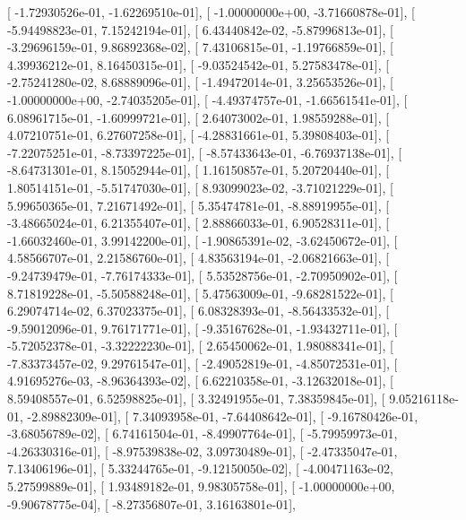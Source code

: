 \documentclass{article}
\begin{document}
       [ -1.72930526e-01,  -1.62269510e-01],
       [ -1.00000000e+00,  -3.71660878e-01],
       [ -5.94498823e-01,   7.15242194e-01],
       [  6.43440842e-02,  -5.87996813e-01],
       [ -3.29696159e-01,   9.86892368e-02],
       [  7.43106815e-01,  -1.19766859e-01],
       [  4.39936212e-01,   8.16450315e-01],
       [ -9.03524542e-01,   5.27583478e-01],
       [ -2.75241280e-02,   8.68889096e-01],
       [ -1.49472014e-01,   3.25653526e-01],
       [ -1.00000000e+00,  -2.74035205e-01],
       [ -4.49374757e-01,  -1.66561541e-01],
       [  6.08961715e-01,  -1.60999721e-01],
       [  2.64073002e-01,   1.98559288e-01],
       [  4.07210751e-01,   6.27607258e-01],
       [ -4.28831661e-01,   5.39808403e-01],
       [ -7.22075251e-01,  -8.73397225e-01],
       [ -8.57433643e-01,  -6.76937138e-01],
       [ -8.64731301e-01,   8.15052944e-01],
       [  1.16150857e-01,   5.20720440e-01],
       [  1.80514151e-01,  -5.51747030e-01],
       [  8.93099023e-02,  -3.71021229e-01],
       [  5.99650365e-01,   7.21671492e-01],
       [  5.35474781e-01,  -8.88919955e-01],
       [ -3.48665024e-01,   6.21355407e-01],
       [  2.88866033e-01,   6.90528311e-01],
       [ -1.66032460e-01,   3.99142200e-01],
       [ -1.90865391e-02,  -3.62450672e-01],
       [  4.58566707e-01,   2.21586760e-01],
       [  4.83563194e-01,  -2.06821663e-01],
       [ -9.24739479e-01,  -7.76174333e-01],
       [  5.53528756e-01,  -2.70950902e-01],
       [  8.71819228e-01,  -5.50588248e-01],
       [  5.47563009e-01,  -9.68281522e-01],
       [  6.29074714e-02,   6.37023375e-01],
       [  6.08328393e-01,  -8.56433532e-01],
       [ -9.59012096e-01,   9.76171771e-01],
       [ -9.35167628e-01,  -1.93432711e-01],
       [ -5.72052378e-01,  -3.32222230e-01],
       [  2.65450062e-01,   1.98088341e-01],
       [ -7.83373457e-02,   9.29761547e-01],
       [ -2.49052819e-01,  -4.85072531e-01],
       [  4.91695276e-03,  -8.96364393e-02],
       [  6.62210358e-01,  -3.12632018e-01],
       [  8.59408557e-01,   6.52598825e-01],
       [  3.32491955e-01,   7.38359845e-01],
       [  9.05216118e-01,  -2.89882309e-01],
       [  7.34093958e-01,  -7.64408642e-01],
       [ -9.16780426e-01,  -3.68056789e-02],
       [  6.74161504e-01,  -8.49907764e-01],
       [ -5.79959973e-01,  -4.26330316e-01],
       [ -8.97539838e-02,   3.09730489e-01],
       [ -2.47335047e-01,   7.13406196e-01],
       [  5.33244765e-01,  -9.12150050e-02],
       [ -4.00471163e-02,   5.27599889e-01],
       [  1.93489182e-01,   9.98305758e-01],
       [ -1.00000000e+00,  -9.90678775e-04],
       [ -8.27356807e-01,   3.16163801e-01],
\end{document}
